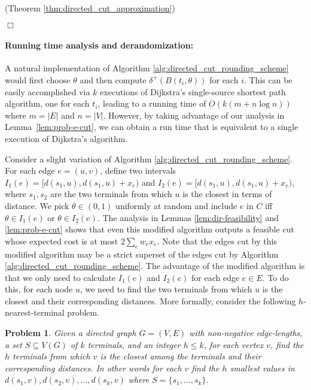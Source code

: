 \documentclass[11pt]{article}
\newtheorem{prob}{Problem}
\renewenvironment{proof}{\vspace{-0.1in}\noindent{\bf Proof:}}{\hspace*{\fill}$\Box$\par}
\begin{document}
\begin{proof}(Theorem \ref{thm:directed_cut_approximation})

\end{proof}
\fi

\paragraph{Running time analysis and derandomization:}
A natural implementation of Algorithm
\ref{alg:directed_cut_rounding_scheme} would first choose $\theta$ and
then compute $\delta^+(B(t_i,\theta))$ for each $i$.  This can be easily
accomplished via $k$ executions of Dijkstra's single-source shortest
path algorithm, one for each $t_i$, leading to a running time of
$O(k(m + n \log n))$ where $m = |E|$ and $n=|V|$. However, by taking
advantage of our analysis in Lemma~\ref{lem:prob-e-cut}, we can obtain
a run time that is equivalent to a single execution of Dijkstra's
algorithm.

Consider a slight variation of Algorithm
\ref{alg:directed_cut_rounding_scheme}. For each edge $e=(u,v)$,
define two intervals $I_1(e) = [d(s_1,u), d(s_1,u) + x_e)$ and $I_2(e)
= [d(s_1,u), d(s_1,u) + x_e)$, where $s_1,s_2$ are the two terminals
from which $u$ is the closest in terms of distance. We pick $\theta
\in (0,1)$ uniformly at random and include $e$ in $C$ iff $\theta \in
I_1(e)$ or $\theta \in I_2(e)$. The analysis in Lemmas
\ref{lem:dir-feasibility} and \ref{lem:prob-e-cut} shows that even
this modified algorithm outputs a feasible cut whose expected cost is at
most $2\sum_e w_e x_e$. Note that the edges cut by this modified
algorithm may be a strict superset of the edges cut by Algorithm
\ref{alg:directed_cut_rounding_scheme}. The advantage of the modified
algorithm is that we only need to calculate $I_1(e)$ and $I_2(e)$ for
each edge $e \in E$. To do this, for each node $u$, we need to find
the two terminals from which $u$ is the closest and their
corresponding distances. More formally, consider the following
$h$-nearest-terminal problem.

\begin{prob}
  Given a directed graph $G=(V,E)$ with non-negative edge-lengths, a set $S
  \subseteq V(G)$ of $k$ terminals, and an integer $h \le k$, for each
  vertex $v$, find the $h$ terminals from which $v$ is the closest
  among the terminals and their corresponding distances. In other
  words for each $v$ find the $h$ smallest values in 
  $d(s_1,v),d(s_2,v),\ldots,d(s_k,v)$ where $S = \{s_1,\ldots,s_k\}$.
\end{prob}
\end{document}
